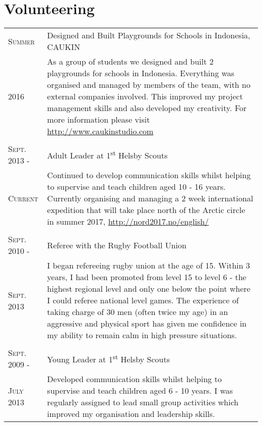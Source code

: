 \documentclass[a4paper]{article}
\begin{document}
\section{Volunteering}
\begin{tabularx}{\textwidth}{lX}
\textsc{Summer} & Designed and Built Playgrounds for Schools in Indonesia, CAUKIN \\
\textsc{2016} & \footnotesize{As a group of students we designed and built 2 playgrounds for schools in Indonesia. Everything was organised and managed by members of the team, with no external companies involved. This improved my project management skills and also developed my creativity. For more information please visit \url{http://www.caukinstudio.com}}
\\
\\
\textsc{Sept. 2013 -} & Adult Leader at 1\textsuperscript{st} Helsby Scouts\\
\textsc{Current} & \footnotesize{Continued to develop communication skills whilst helping to supervise and teach children aged 10 - 16 years.
Currently organising and managing a 2 week international expedition that will take place north of the Arctic circle in summer 2017, \url{http://nord2017.no/english/}}
\\
\\
\textsc{Sept. 2010 -} & Referee with the Rugby Football Union \\
\textsc{Sept. 2013} & \footnotesize{I began refereeing rugby union at the age of 15. Within 3 years, I had been promoted from level 15 to level 6 - the highest regional level and only one below the point where I could referee national level games.
The experience of taking charge of 30 men (often twice my age) in an aggressive and physical sport has given me confidence in my ability to remain calm in high pressure situations.}
\\
\\
\textsc{Sept. 2009 -} & Young Leader at 1\textsuperscript{st} Helsby Scouts\\
\textsc{July 2013} & \footnotesize{Developed communication skills whilst helping to supervise and teach children aged 6 - 10 years.
I was regularly assigned to lead small group activities which improved my organisation and leadership skills.}\\
\end{tabularx}
\end{document}
